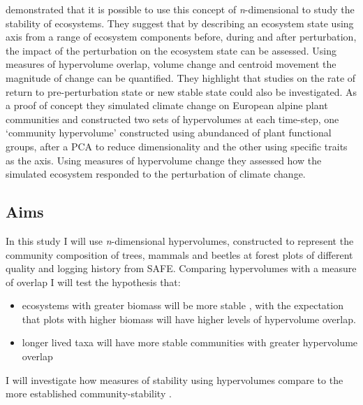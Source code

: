  
\cite{Barros2016} demonstrated that it is possible to use this concept of \emph{n}-dimensional to study the stability of ecosystems. They suggest that by describing an ecosystem state using axis from a range of ecosystem components before, during and after perturbation, the impact of the perturbation on the ecosystem state can be assessed. Using measures of hypervolume overlap, volume change and centroid movement the magnitude of change can be quantified. They highlight that studies on the rate of return to pre-perturbation state or new stable state could also be investigated. As a proof of concept they simulated climate change on European alpine plant communities and constructed two sets of hypervolumes at each time-step, one `community hypervolume' constructed using abundanced of plant functional groups, after a PCA to reduce dimensionality and the other using specific traits as the axis. Using measures of hypervolume change they assessed how the simulated ecosystem responded to the perturbation of climate change.


\subsection{Aims}

In this study I will use \emph{n}-dimensional hypervolumes, constructed to represent the community composition of trees, mammals and beetles at forest plots of different quality and logging history from SAFE. Comparing hypervolumes with a measure of overlap I will test the hypothesis that:

\begin{itemize}
	\item ecosystems with greater biomass will be more stable \citep{Tilman2006}, with the expectation that plots with higher biomass will have higher levels of hypervolume overlap.
	\item longer lived taxa will have more stable communities with greater hypervolume overlap
\end{itemize}
 
 I will investigate how measures of stability using hypervolumes compare to the more established community-stability \citep{Lehman2000}.
 	
